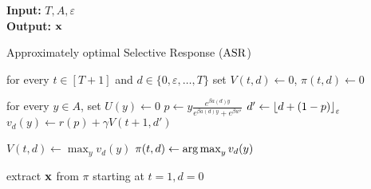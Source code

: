 \begin{algorithm}[t]
\textbf{Input:} $T, A, \varepsilon$ \\
\textbf{Output:} ${\bf{x}}$
\begin{algorithmic}[1]
\small %
\caption{Approximately optimal Selective Response ($\textnormal{ASR}$)} \label{alg: ARMS}
\STATE for every $t \in [T+1]$ and $d \in \{0, \varepsilon ,\ldots, T\}$ set $V(t, d) \leftarrow 0$, $\pi(t, d) \leftarrow 0$

        \STATE for every $y \in A$, set $U(y) \gets 0$ 
            \STATE $p \gets y \frac{e^{\beta a(d) y}}{e^{\beta a(d) y} + e^{\beta w^s}}$
            \STATE $d' \gets {\left\lfloor d + (1-p)\right\rfloor_{\varepsilon}}$ \label{arms: def next data}
            \STATE $v_d(y) \gets r(p) + \gamma V(t+1, d')$
        \ENDFOR

        \STATE $V(t, d) \gets \max_y v_d(y)$
        \STATE $\pi(t, d) \gets \operatorname*{arg\,max}_y v_d(y)$
    \ENDFOR
\ENDFOR

\STATE extract ${\bf{x}}$ from $\pi$ starting at $t = 1, d = 0$
 \;
\end{algorithmic}
\end{algorithm}



